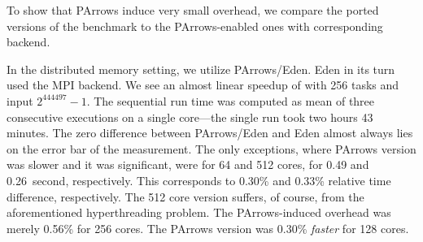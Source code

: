 To show that PArrows induce very small overhead, we compare the ported
versions of the benchmark to the PArrows-enabled ones with
corresponding backend.

In the distributed memory setting, we utilize PArrows/Eden. Eden in
its turn used the MPI backend. We see an almost linear speedup of
\rmtest with 256 tasks and input $2^444497-1$. The sequential run time
was computed as mean of three consecutive executions on a single
core---the single run took two hours 43 minutes. The zero difference  between
PArrows/Eden and Eden almost always lies on the error bar of
the measurement. The only exceptions, where PArrows version was slower
and it was significant, were for 64 and
512 cores, for 0.49 and 0.26~second, respectively. This corresponds to
0.30\% and 0.33\% relative time difference, respectively. The 512 core
version suffers, of course, from the aforementioned hyperthreading
problem. The PArrows-induced overhead was merely 0.56\% for 256
cores. The PArrows version was 0.30\% \emph{faster} for 128 cores.
